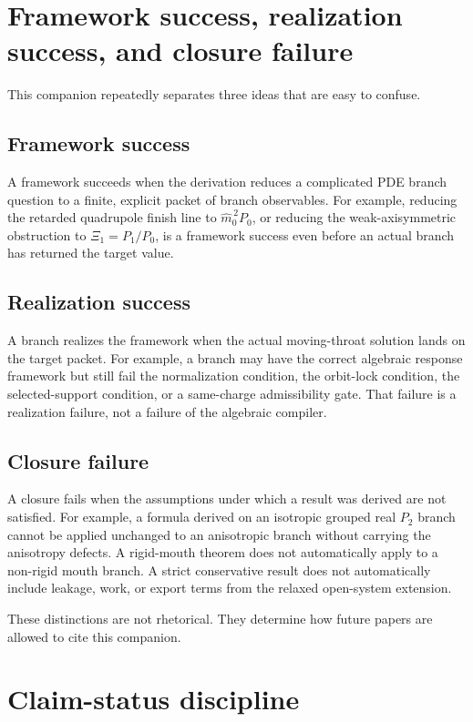 \section{Framework success, realization success, and closure failure}

This companion repeatedly separates three ideas that are easy to confuse.

\subsection{Framework success}

A framework succeeds when the derivation reduces a complicated PDE branch question to a finite, explicit packet of branch observables.  For example, reducing the retarded quadrupole finish line to \(\widehat m_0^{\,2}P_0\), or reducing the weak-axisymmetric obstruction to \(\Xi_1=P_1/P_0\), is a framework success even before an actual branch has returned the target value.

\subsection{Realization success}

A branch realizes the framework when the actual moving-throat solution lands on the target packet.  For example, a branch may have the correct algebraic response framework but still fail the normalization condition, the orbit-lock condition, the selected-support condition, or a same-charge admissibility gate.  That failure is a realization failure, not a failure of the algebraic compiler.

\subsection{Closure failure}

A closure fails when the assumptions under which a result was derived are not satisfied.  For example, a formula derived on an isotropic grouped real \(P_2\) branch cannot be applied unchanged to an anisotropic branch without carrying the anisotropy defects.  A rigid-mouth theorem does not automatically apply to a non-rigid mouth branch.  A strict conservative result does not automatically include leakage, work, or export terms from the relaxed open-system extension.

These distinctions are not rhetorical.  They determine how future papers are allowed to cite this companion.

\section{Claim-status discipline}


